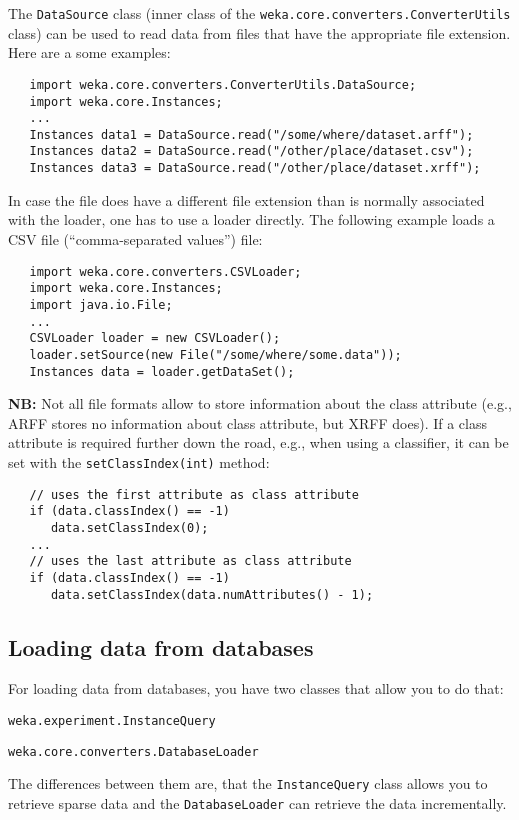The \texttt{DataSource} class (inner class of the
\texttt{weka.core.converters.ConverterUtils} class) can be used to read data
from files that have the appropriate file extension. Here are a some examples:
\begin{verbatim}
   import weka.core.converters.ConverterUtils.DataSource;
   import weka.core.Instances;
   ...
   Instances data1 = DataSource.read("/some/where/dataset.arff");
   Instances data2 = DataSource.read("/other/place/dataset.csv");
   Instances data3 = DataSource.read("/other/place/dataset.xrff");
\end{verbatim}
In case the file does have a different file extension than is normally
associated with the loader, one has to use a loader directly. The following
example loads a CSV file (``comma-separated values'') file:
\begin{verbatim}
   import weka.core.converters.CSVLoader;
   import weka.core.Instances;
   import java.io.File;
   ...
   CSVLoader loader = new CSVLoader();
   loader.setSource(new File("/some/where/some.data"));
   Instances data = loader.getDataSet();
\end{verbatim}
\textbf{NB:} Not all file formats allow to store information about the class
attribute (e.g., ARFF stores no information about class attribute, but XRFF
does). If a class attribute is required further down the road, e.g., when using
a classifier, it can be set with the \texttt{setClassIndex(int)} method:
\begin{verbatim}
   // uses the first attribute as class attribute
   if (data.classIndex() == -1)
      data.setClassIndex(0);
   ...
   // uses the last attribute as class attribute
   if (data.classIndex() == -1)
      data.setClassIndex(data.numAttributes() - 1);
\end{verbatim}

\subsection{Loading data from databases}
For loading data from databases, you have two classes that allow you to do that:
\begin{tight_itemize}
	\item \texttt{weka.experiment.InstanceQuery}
	\item \texttt{weka.core.converters.DatabaseLoader}
\end{tight_itemize}
The differences between them are, that the \texttt{InstanceQuery} class allows
you to retrieve sparse data and the \texttt{DatabaseLoader} can retrieve the
data incrementally. \\

